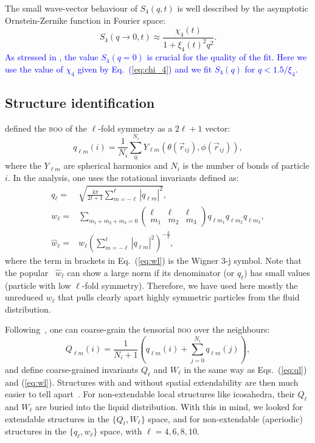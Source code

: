 The small wave-vector behaviour of $S_4(q,t)$ is well described by the asymptotic Ornstein-Zernike function in Fourier space:
\begin{equation}
	S_4(q\rightarrow 0,t) \approx \frac{\chi_4(t)}{1+\xi_4(t)^2 q^2}.
	\label{eq:OZ_Fourier}
\end{equation}
\textcolor{blue}{As stressed in \citep{Flenner2011}, the value $S_4(q=0)$ is crucial for the quality of the fit. Here we use the value of $\chi_4$ given by Eq.~(\ref{eq:chi_4}) and we fit $S_4(q)$ for $q<1.5/\xi_4$.}

\subsection*{Structure identification}

\citet{steinhardt1983boo} defined the \textsc{boo} of the $\ell$-fold symmetry as a $2\ell+1$ vector:
\begin{equation}
	q_{\ell m}(i) = \frac{1}{N_i}\sum_{0}^{N_i} Y_{\ell m}(\theta(\vec r_{ij}),\phi(\vec r_{ij})),
	\label{eq:qlm}
\end{equation}
where the $Y_{\ell m}$ are spherical harmonics and $N_i$ is the number of bonds of particle $i$. In the analysis, one uses the rotational invariants defined as:
\begin{align}
	q_\ell =& \sqrt{\frac{4\pi}{2l+1} \sum_{m=-\ell}^{\ell} |q_{\ell m}|^2 }, \label{eq:ql}\\
	w_\ell =& \sum_{m_1+m_2+m_3=0} 
			\left( \begin{array}{ccc}
				\ell & \ell & \ell \\
				m_1 & m_2 & m_3 
			\end{array} \right)
			q_{\ell m_1} q_{\ell m_2} q_{\ell m_3}, \label{eq:wl}\\
	\hat{w}_\ell =& w_\ell{\left( \sum_{m=-\ell}^{\ell} |q_{\ell m}|^2 \right)}^{-\frac{3}{2}},
\end{align}
where the term in brackets in Eq.~(\ref{eq:wl}) is the Wigner 3-j symbol. Note that the popular~\citep{steinhardt1983boo,Lechner2008} $\hat{w}_\ell$ can show a large norm if its denominator (or $q_\ell$) has small values (particle with low $\ell$-fold symmetry). Therefore, we have used here mostly the unreduced $w_\ell$ that pulls clearly apart highly symmetric particles from the fluid distribution.

Following~\citet{Lechner2008}, one can coarse-grain the tensorial \textsc{boo} over the neighbours:
\begin{equation}
	Q_{\ell m}(i) = \frac{1}{N_i+1}\left( q_{\ell m}(i) +  \sum_{j=0}^{N_i} q_{\ell m}(j)\right), 
	\label{eq:Qlm}
\end{equation}
and define coarse-grained invariants $Q_\ell$ and $W_\ell$ in the same way as Eqs.~(\ref{eq:ql}) and (\ref{eq:wl}). Structures with and without spatial extendability are then much easier to tell apart~\citep{Lechner2008}. For non-extendable local structures like icosahedra, their $Q_\ell$ and $W_\ell$ are buried into the liquid distribution. With this in mind, we looked for extendable structures in the $\lbrace Q_\ell, W_\ell\rbrace$ space, and for non-extendable (aperiodic) structures in the $\lbrace q_\ell, w_\ell\rbrace$ space, with $\ell=4,6,8,10$.

